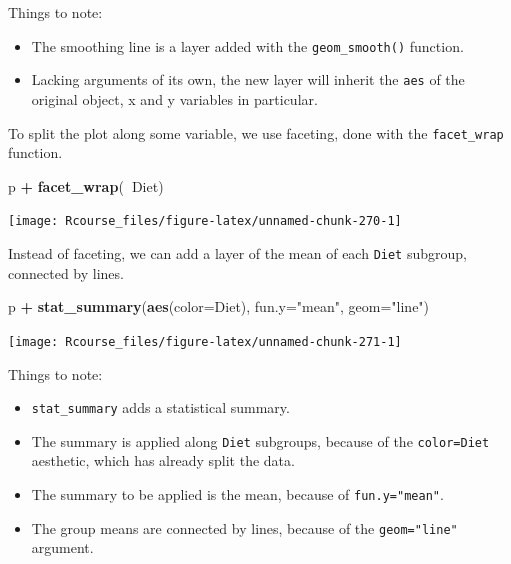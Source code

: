 \documentclass[]{book}
\newenvironment{Shaded}{\begin{snugshade}}{\end{snugshade}}
\newcommand{\KeywordTok}[1]{\textcolor[rgb]{0.13,0.29,0.53}{\textbf{#1}}}
\newcommand{\DataTypeTok}[1]{\textcolor[rgb]{0.13,0.29,0.53}{#1}}
\newcommand{\StringTok}[1]{\textcolor[rgb]{0.31,0.60,0.02}{#1}}
\newcommand{\OperatorTok}[1]{\textcolor[rgb]{0.81,0.36,0.00}{\textbf{#1}}}
\newcommand{\NormalTok}[1]{#1}
\providecommand{\tightlist}{%
  \setlength{\itemsep}{0pt}\setlength{\parskip}{0pt}}
\theoremstyle{definition}
\theoremstyle{definition}
\theoremstyle{definition}
\theoremstyle{remark}
\begin{document}
Things to note:

\begin{itemize}
\tightlist
\item
  The smoothing line is a layer added with the \texttt{geom\_smooth()}
  function.
\item
  Lacking arguments of its own, the new layer will inherit the
  \texttt{aes} of the original object, x and y variables in particular.
\end{itemize}

To split the plot along some variable, we use faceting, done with the
\texttt{facet\_wrap} function.

\begin{Shaded}
\begin{Highlighting}[]
\NormalTok{p }\OperatorTok{+}\StringTok{ }\KeywordTok{facet_wrap}\NormalTok{(}\OperatorTok{~}\NormalTok{Diet)}
\end{Highlighting}
\end{Shaded}

\texttt{[image: Rcourse\_files/figure-latex/unnamed-chunk-270-1]}

Instead of faceting, we can add a layer of the mean of each
\texttt{Diet} subgroup, connected by lines.

\begin{Shaded}
\begin{Highlighting}[]
\NormalTok{p }\OperatorTok{+}\StringTok{ }\KeywordTok{stat_summary}\NormalTok{(}\KeywordTok{aes}\NormalTok{(}\DataTypeTok{color=}\NormalTok{Diet), }\DataTypeTok{fun.y=}\StringTok{"mean"}\NormalTok{, }\DataTypeTok{geom=}\StringTok{"line"}\NormalTok{)}
\end{Highlighting}
\end{Shaded}

\texttt{[image: Rcourse\_files/figure-latex/unnamed-chunk-271-1]}

Things to note:

\begin{itemize}
\tightlist
\item
  \texttt{stat\_summary} adds a statistical summary.
\item
  The summary is applied along \texttt{Diet} subgroups, because of the
  \texttt{color=Diet} aesthetic, which has already split the data.
\item
  The summary to be applied is the mean, because of
  \texttt{fun.y="mean"}.
\item
  The group means are connected by lines, because of the
  \texttt{geom="line"} argument.
\end{itemize}
\end{document}
